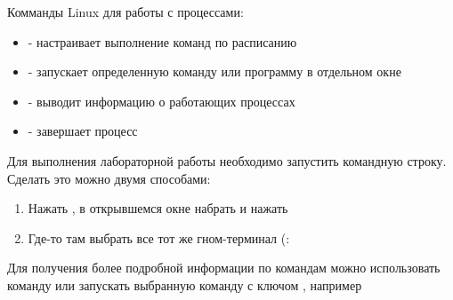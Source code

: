 \documentclass[a4paper,12pt]{article}
\begin{document}
  
  \begin{flushleft}
    Комманды Linux для работы с процессами:
    \begin{itemize}
      \item {} - настраивает выполнение команд по расписанию
      \item {} - запускает определенную команду или программу в отдельном окне
      \item {} - выводит информацию о работающих процессах
      \item {} - завершает процесс
    \end{itemize}
  \end{flushleft}
  
  \begin{flushleft}
    Для выполнения лабораторной работы необходимо запустить командную строку. Сделать это можно двумя способами:
    \begin{enumerate}
      \item Нажать , в открывшемся окне набрать  и нажать 
      \item Где-то там выбрать все тот же гном-терминал (:
    \end{enumerate}
  \end{flushleft}
  
  \begin{flushleft}
    Для получения более подробной информации по командам можно использовать команду  или запускать выбранную команду с ключом , например  \linebreak
  \end{flushleft}
\end{document}
